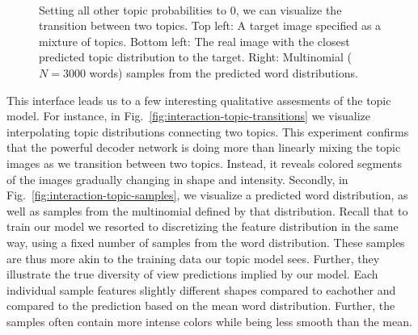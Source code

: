 \begin{figure}
    \centering
    \\
    \caption{\protect{} Setting all other topic probabilities to 0, we can visualize the transition between two topics.
             \protect{} Top left: A target image specified as a mixture of topics. Bottom left: The real image with the closest predicted topic distribution to the target. Right: Multinomial ($N=3000$ words) samples from the predicted word distributions.}
    \label{fig:interaction-insights}
\end{figure}

This interface leads us to a few interesting qualitative assesments of the topic model. For instance, in Fig.~\ref{fig:interaction-topic-transitions} we visualize interpolating topic distributions connecting two topics. This experiment confirms that the powerful decoder network is doing more than linearly mixing the topic images as we transition between two topics. Instead, it reveals colored segments of the images gradually changing in shape and intensity. Secondly, in Fig.~\ref{fig:interaction-topic-samples}, we visualize a predicted word distribution, as well as samples from the multinomial defined by that distribution. Recall that to train our model we resorted to discretizing the feature distribution in the same way, using a fixed number of samples from the word distribution. These samples are thus more akin to the training data our topic model sees. Further, they illustrate the true diversity of view predictions implied by our model. Each individual sample features slightly different shapes compared to eachother and compared to the prediction based on the mean word distribution. Further, the samples often contain more intense colors while being less smooth than the mean.

